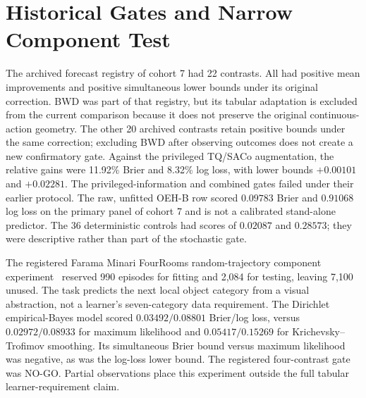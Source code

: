 \section{Historical Gates and Narrow Component Test}
The archived forecast registry of cohort 7 had 22 contrasts. All had positive mean improvements and positive simultaneous lower bounds under its original correction. BWD was part of that registry, but its tabular adaptation is excluded from the current comparison because it does not preserve the original continuous-action geometry. The other 20 archived contrasts retain positive bounds under the same correction; excluding BWD after observing outcomes does not create a new confirmatory gate. Against the privileged TQ/SACo augmentation, the relative gains were 11.92\% Brier and 8.32\% log loss, with lower bounds $+0.00101$ and $+0.02281$. The privileged-information and combined gates failed under their earlier protocol. The raw, unfitted OEH-B row scored $0.09783$ Brier and $0.91068$ log loss on the primary panel of cohort 7 and is not a calibrated stand-alone predictor. The 36 deterministic controls had \OEH{} scores of $0.02087$ and $0.28573$; they were descriptive rather than part of the stochastic gate.

The registered Farama Minari FourRooms random-trajectory component experiment~\cite{farama_minari_fourrooms} reserved 990 episodes for fitting and 2,084 for testing, leaving 7,100 unused. The task predicts the next local object category from a visual abstraction, not a learner's seven-category data requirement. The Dirichlet empirical-Bayes model scored $0.03492/0.08801$ Brier/log loss, versus $0.02972/0.08933$ for maximum likelihood and $0.05417/0.15269$ for Krichevsky--Trofimov smoothing. Its simultaneous Brier bound versus maximum likelihood was negative, as was the log-loss lower bound. The registered four-contrast gate was NO-GO. Partial observations place this experiment outside the full tabular learner-requirement claim.
